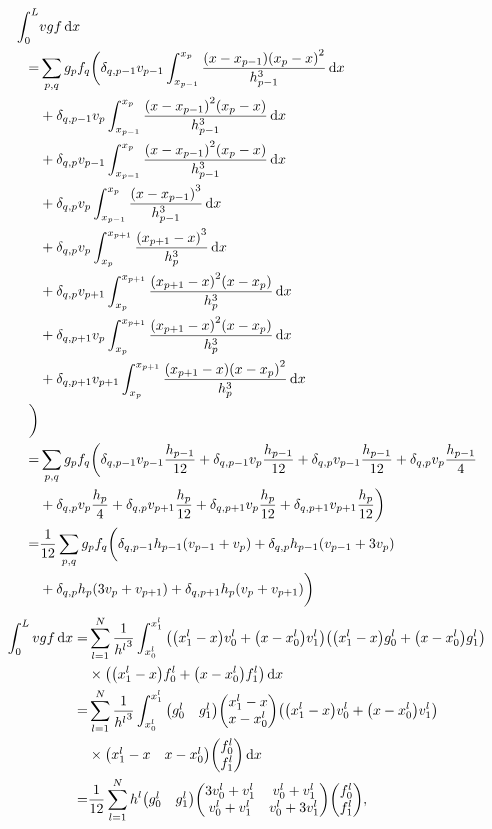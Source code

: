 \documentclass[xelatex,ja=standard]{bxjsarticle}
\begin{document}
\begin{align}
    \int_0^L& vgf\dd{x}\notag\\
     =& \sum_{p, q}g_pf_q\bigg(\delta_{q, p - 1}v_{p-1}\int_{x_{p-1}}^{x_p}\dfrac{\qty(x-x_{p-1})\qty(x_{p} - x)^2}{h_{p-1}^3}\dd{x}\notag\\
    &+\delta_{q, p - 1}v_{p}\int_{x_{p-1}}^{x_p}\dfrac{\qty(x-x_{p-1})^2\qty(x_{p} - x)}{h_{p-1}^3}\dd{x}\notag\\
    &+\delta_{q, p}v_{p-1}\int_{x_{p-1}}^{x_p}\dfrac{\qty(x-x_{p-1})^2\qty(x_{p} - x)}{h_{p-1}^3}\dd{x}\notag\\
    &+\delta_{q, p}v_{p}\int_{x_{p-1}}^{x_p}\dfrac{\qty(x-x_{p-1})^3}{h_{p-1}^3}\dd{x}\notag\\
    &+\delta_{q, p}v_{p}\int_{x_{p}}^{x_{p+1}}\dfrac{\qty(x_{p+1} - x)^3}{h_{p}^3}\dd{x}\notag\\
    &+\delta_{q, p}v_{p+1}\int_{x_{p}}^{x_{p+1}}\dfrac{\qty(x_{p+1} - x)^2\qty(x-x_{p})}{h_{p}^3}\dd{x}\notag\\
    &+\delta_{q, p+1}v_{p}\int_{x_{p}}^{x_{p+1}}\dfrac{\qty(x_{p+1} - x)^2\qty(x-x_{p})}{h_{p}^3}\dd{x}\notag\\
    &+\delta_{q, p+1}v_{p+1}\int_{x_{p}}^{x_{p+1}}\dfrac{\qty(x_{p+1} - x)\qty(x-x_{p})^2}{h_{p}^3}\dd{x}\notag\\
    \bigg)\notag\\
    =& \sum_{p, q}g_pf_q\bigg(\delta_{q, p - 1}v_{p-1}\frac{h_{p-1}}{12}+\delta_{q, p - 1}v_{p}\frac{h_{p-1}}{12}+\delta_{q, p}v_{p-1}\frac{h_{p-1}}{12} +\delta_{q, p}v_{p}\frac{h_{p-1}}{4}\notag\\
    &+\delta_{q, p}v_{p}\frac{h_{p}}{4} + \delta_{q, p}v_{p+1}\frac{h_p}{12}+\delta_{q, p+1}v_{p}\frac{h_p}{12}+\delta_{q, p+1}v_{p+1}\frac{h_{p}}{12}\bigg)\notag\\
    =& \frac{1}{12}\sum_{p, q}g_pf_q\bigg(\delta_{q, p - 1}h_{p-1}\qty(v_{p-1} + v_p)+\delta_{q, p}h_{p-1}\qty(v_{p-1} + 3v_p) \notag\\
    &+\delta_{q, p}h_{p}\qty(3v_p + v_{p+1})+\delta_{q, p+1}h_p\qty(v_{p} + v_{p+1})\bigg)\notag\\
\end{align}
\begin{align}
    \int_0^L vgf\dd{x}
    =& \sum_{l=1}^N \frac{1}{{h^l}^3}\int_{x^l_0}^{x^l_1}
    \qty(\qty(x^l_1 - x)v^l_0 + \qty(x-x^l_0)v^l_1)
    \qty(\qty(x^l_1 - x)g^l_0 + \qty(x-x^l_0)g^l_1)\notag\\
    &\times\qty(\qty(x^l_1 - x)f^l_0 + \qty(x-x^l_0)f^l_1)
    \dd{x}\notag\\
    =& \sum_{l=1}^N \frac{1}{{h^l}^3}\int_{x^l_0}^{x^l_1}
    \mqty(g^l_0 & g^l_1) \mqty(x^l_1 - x \\ x-x^l_0)
    \qty(\qty(x^l_1 - x)v^l_0 + \qty(x-x^l_0)v^l_1)\notag\\
    &\times\mqty(x^l_1 - x & x-x^l_0)\mqty(f^l_0 \\ f^l_1)
    \dd{x}\notag\\
    =& \frac{1}{12}\sum_{l=1}^N h^l
    \mqty(g^l_0 & g^l_1) \mqty(3v_0^l +v_1^l & v_0^l +v_1^l\\ v_0^l +v_1^l&v_0^l +3v_1^l)\mqty(f^l_0 \\ f^l_1),
\end{align}
\end{document}
